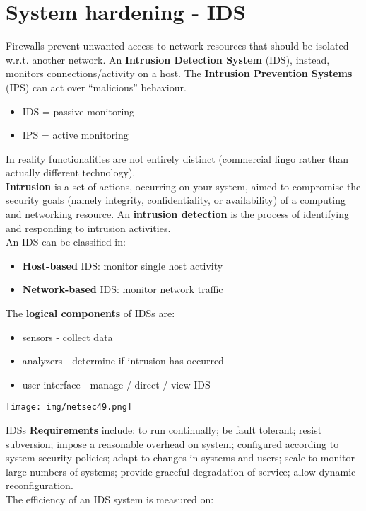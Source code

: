 \documentclass[a4paper, 10pt, titlepage]{article}
\begin{document}
\section{System hardening - IDS}
Firewalls prevent unwanted access to network resources that should be isolated w.r.t. another network. An \textbf{Intrusion Detection System} (IDS), instead, monitors connections/activity on a host. The \textbf{Intrusion Prevention Systems} (IPS) can act over “malicious” behaviour.
\begin{itemize}
	\item IDS = passive monitoring
	\item IPS = active monitoring
\end{itemize}
In reality functionalities are not entirely distinct (commercial lingo rather than actually different technology). \medskip\\
\textbf{Intrusion} is a set of actions, occurring on your system, aimed to compromise the security goals (namely integrity, confidentiality, or availability) of a computing and networking resource. An \textbf{intrusion detection} is the process of identifying and responding to intrusion activities. \medskip\\
An IDS can be classified in:
\begin{itemize}
	\item \textbf{Host-based} IDS: monitor single host activity
	\item \textbf{Network-based} IDS: monitor network traffic
\end{itemize}
The \textbf{logical components} of IDSs are:
\begin{itemize}
	\item sensors - collect data
	\item analyzers - determine if intrusion has occurred
	\item user interface - manage / direct / view IDS
\end{itemize}
\begin{center}
	\texttt{[image: img/netsec49.png]}
\end{center}
IDSs \textbf{Requirements} include: to run continually; be fault tolerant; resist subversion; impose a reasonable overhead on system; configured according to system security policies; adapt to changes in systems and users; scale to monitor large numbers of systems; provide graceful degradation of service; allow dynamic reconfiguration. \medskip\\
The efficiency of an IDS system is measured on:
\end{document}
